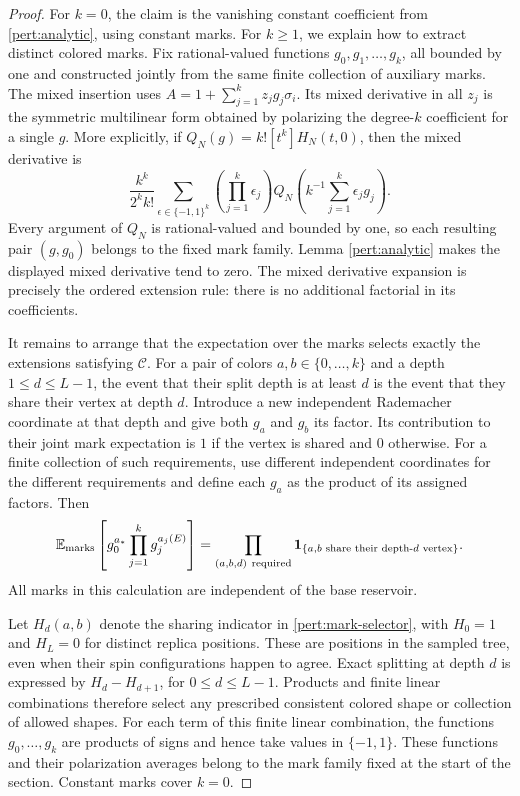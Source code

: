 \begin{proof}
For $k=0$, the claim is the vanishing constant coefficient from
\cref{pert:analytic}, using constant marks. For $k\ge1$, we explain
how to extract distinct colored marks. Fix rational-valued functions
$g_0,g_1,\ldots,g_k$, all bounded by one and constructed jointly from
the same finite collection of auxiliary marks.  The mixed insertion
uses $A=1+\sum_{j=1}^kz_jg_j\sigma_i$.  Its mixed derivative in all
$z_j$ is the symmetric multilinear form obtained by polarizing the
degree-$k$ coefficient for a single $g$.  More explicitly, if
$Q_N(g)=k![t^k]H_N(t,0)$, then the mixed derivative is
\[
 \frac{k^k}{2^k k!}
 \sum_{\epsilon\in\{-1,1\}^k}
    \left(\prod_{j=1}^k\epsilon_j\right)
 Q_N\left(k^{-1}\sum_{j=1}^k\epsilon_jg_j\right).
\]
Every argument of $Q_N$ is rational-valued and bounded by one, so each
resulting pair $(g,g_0)$ belongs to the fixed mark family.  Lemma
\ref{pert:analytic} makes the displayed mixed derivative tend to zero.
The mixed derivative expansion is precisely the ordered extension
rule: there is no additional factorial in its coefficients.

It remains to arrange that the expectation over the marks selects
exactly the extensions satisfying $\mathcal C$.  For a pair of colors
$a,b\in\{0,\ldots,k\}$ and a depth $1\leq d\leq L-1$, the event
that their split depth is at least $d$ is the event that they share
their vertex at depth $d$.  Introduce a new independent Rademacher
coordinate at that depth and give both $g_a$ and $g_b$ its factor.
Its contribution to their joint mark expectation is $1$ if the
vertex is shared and $0$ otherwise.  For a finite collection of such
requirements, use different independent coordinates for the
different requirements and define each $g_a$ as the product of its
assigned factors.  Then
\begin{equation}
 \mathbb E_{\rm marks}
       \left[g_0^{a_*}\prod_{j=1}^kg_j^{a_j(E)}\right]
 =\prod_{(a,b,d)\ {\rm required}}
       \mathbf1_{\{a,b\text{ share their depth-}d\text{ vertex}\}}.
 \label{pert:mark-selector}
\end{equation}
All marks in this calculation are independent of the base reservoir.

Let $H_d(a,b)$ denote the sharing indicator in
\eqref{pert:mark-selector}, with $H_0=1$ and $H_L=0$ for distinct
replica positions. These are positions in the sampled tree, even when
their spin configurations happen to agree. Exact splitting at depth $d$ is expressed by
$H_d-H_{d+1}$, for $0\leq d\leq L-1$.  Products and finite linear
combinations therefore select any prescribed consistent colored
shape or collection of allowed shapes. For each term of this finite
linear combination, the functions $g_0,\ldots,g_k$ are products of signs
and hence take values in $\{-1,1\}$. These functions and their
polarization averages belong to the mark family fixed at the start of
the section. Constant marks cover $k=0$.


\end{proof}
